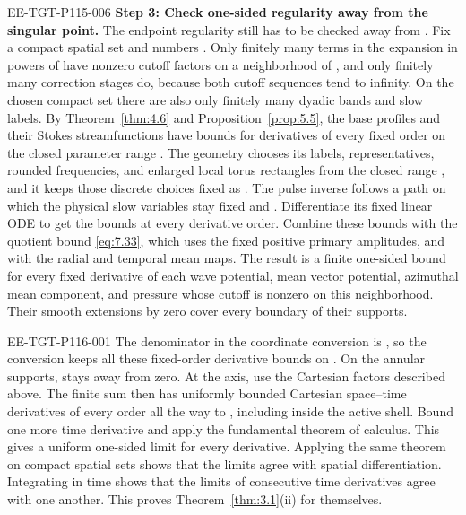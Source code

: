 \begin{EESegment}{EE-TGT-P115-006}
\noindent\textbf{Step 3: Check one-sided regularity away from the singular point.} The endpoint
regularity still has to be checked away from . Fix a compact spatial set
and numbers . Only finitely many terms in the expansion in powers
of  have nonzero cutoff factors on a neighborhood of
, and only finitely many correction stages
do, because both cutoff sequences tend to infinity. On the chosen compact set there are also only
finitely many dyadic bands and slow labels. By Theorem~\ref{thm:4.6} and
Proposition~\ref{prop:5.5}, the base profiles and their Stokes streamfunctions have bounds for
derivatives of every fixed order on the closed parameter range
. The geometry chooses its labels, representatives, rounded
frequencies, and enlarged local torus rectangles from the closed range
, and it keeps those discrete choices fixed as
. The pulse inverse follows a path on which the physical slow
variables stay fixed and . Differentiate its fixed linear ODE to
get the bounds at every derivative order. Combine these bounds with the quotient bound
\eqref{eq:7.33}, which uses the fixed positive primary amplitudes, and with the radial and temporal
mean maps. The result is a finite one-sided bound for every fixed derivative of each wave
potential, mean
%
vector potential, azimuthal mean component, and pressure whose cutoff is nonzero on this
neighborhood. Their smooth extensions by zero cover every boundary of their supports.
\end{EESegment}

\begin{EESegment}{EE-TGT-P116-001}
The denominator in the coordinate conversion is
, so the conversion keeps all these fixed-order derivative bounds
on . On the annular supports,
 stays away from zero. At the axis, use the Cartesian factors described
above. The finite sum then has uniformly bounded Cartesian space--time derivatives of every order
all the way to , including inside the active shell. Bound one more
time derivative and apply the fundamental theorem of calculus. This gives a uniform one-sided
limit for every derivative. Applying the same theorem on compact spatial sets shows that the limits
agree with spatial differentiation. Integrating in time shows that the limits of consecutive time
derivatives agree with one another. This proves Theorem~\ref{thm:3.1}\textup{(ii)} for
 themselves.
\end{EESegment}

